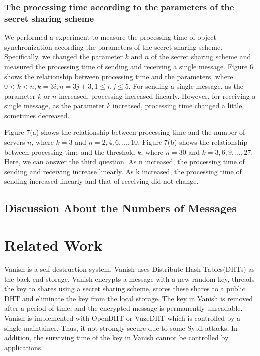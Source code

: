 \documentclass[twocolumn,10pt]{article}
\begin{document}
\subsubsection{The processing time according to the parameters of the secret sharing scheme}

We performed a experiment to measure the processing time of object synchronization according the parameters of the secret sharing scheme.
Specifically, we changed the parameter ${k}$  and ${n}$ of the secret sharing scheme and measured the processing time of sending and receiving a single message.
Figure 6 shows the relationship between processing time and the parameters, where ${0< k < n, k=3i, n=3j+3, 1 \leq i, j \leq 5}$.
For sending a single message, as the parameter ${k}$ or ${n}$ increased, processing increased linearly.
However, for receiving a single message, as the parameter ${k}$ increased, processing time  changed a little, sometimes decreased.

Figure 7(a) shows the relationship between processing time and the number of servers ${n}$, where ${k=3}$ and ${n = 2, 4, 6, ... , 10}$. 
Figure 7(b) shows the relationship between processing time and the threshold ${k}$, where ${n=30}$ and ${k = 3, 6, 9, ... , 27}$. 
Here, we can answer the third question.
As n increased, the processing time of sending and receiving increase linearly. 
As k increased, the processing time of sending increased linearly and that of receiving did not change. 

\subsection{Discussion About the Numbers of Messages}

\section{Related Work}

Vanish is a self-destruction system\cite{geambasu2009vanish}. 
Vanish uses Distribute Hash Tables(DHTs) as the back-end storage.
Vanish encrypts a message with a new random key, threads the key to shares using a secret sharing scheme, stores these shares to a public DHT and eliminate the key from the local storage.
The key in Vanish is removed after a period of time, and the encrypted message is permanently unreadable.
Vanish is implemented with OpenDHT\cite{rhea2005opendht} or VuzeDHT\cite{vuzedht} which is controlled by a single maintainer. 
Thus, it not strongly secure due to some Sybil attacks\cite{wolchok2010defeating}. 
In addition, the surviving time of the key in Vanish cannot be controlled by applications. 
\end{document}

